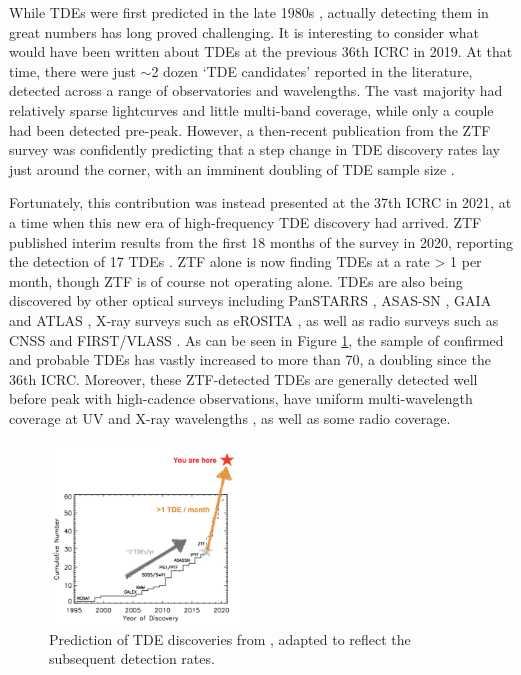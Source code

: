 \documentclass[a4paper,11pt]{article}
\begin{document}
While TDEs were first predicted in the late 1980s \cite{rees_tde_88}, actually detecting them in great numbers has long proved challenging. It is interesting to consider what would have been written about TDEs at the previous 36th ICRC in 2019. At that time, there were just $\sim$2 dozen `TDE candidates' reported in the literature, detected across a range of observatories and wavelengths. The vast majority had relatively sparse lightcurves and little multi-band coverage, while only a couple had been detected pre-peak. However, a then-recent publication from the ZTF survey was confidently predicting that a step change in TDE discovery rates lay just around the corner, with an imminent doubling of TDE sample size \cite{ztf_19_science}.

Fortunately, this contribution was instead presented at the 37th ICRC in 2021, at a time when this new era of high-frequency TDE discovery had arrived. ZTF published interim results from the first 18 months of the survey in 2020, reporting the detection of 17 TDEs \cite{van_velzen_20}. ZTF alone is now finding TDEs at a rate > 1 per month, though ZTF is of course not operating alone. TDEs are also being discovered by other optical surveys including PanSTARRS \cite{gezari_12}, ASAS-SN \cite{holoien_16}, GAIA \cite{gaia_tde_18} and ATLAS \cite{nicholl_19}, X-ray surveys such as eROSITA \cite{erosita_tde_21}, as well as radio surveys such as CNSS \cite{anderson_20} and FIRST/VLASS \cite{ravi_21}. As can be seen in Figure \ref{fig:tde_disc}, the sample of confirmed and probable TDEs has vastly increased to more than 70, a doubling since the 36th ICRC. Moreover, these ZTF-detected TDEs are generally detected well before peak with high-cadence observations, have uniform multi-wavelength coverage at UV and X-ray wavelengths \cite{van_velzen_20}, as well as some radio coverage. 

\begin{figure}[!ht]
	\centering \includegraphics[width=0.45\textwidth]{figures/ztf_prediction}
	\caption{Prediction of TDE discoveries from \cite{ztf_19_science}, adapted to reflect the subsequent detection rates.}
	\label{fig:tde_disc}
\end{figure}
\end{document}
